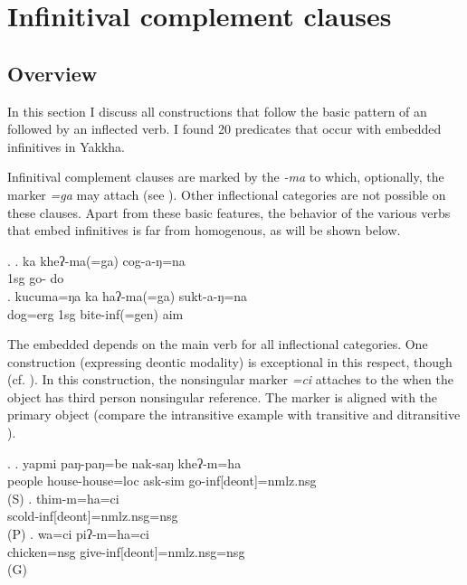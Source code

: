 \section{Infinitival complement clauses}\label{nonfin-comp}
\subsection{Overview}

In this section I discuss all constructions that follow the basic pattern of an  followed by an inflected verb. I found 20 predicates  that occur with embedded infinitives in Yakkha. 

Infinitival complement clauses are marked by the  \emph{-ma} to which, optionally, the  marker \emph{=ga}  may attach (see \Next). Other inflectional categories are not possible on these clauses. Apart from these basic features, the behavior of the various verbs that  embed infinitives is far from homogenous, as will be shown below. 

 \ex. \ag. ka kheʔ-ma(=ga) cog-a-ŋ=na\\
		{\sc 1sg}  go- do\\
		\bg. kucuma=ŋa ka haʔ-ma(=ga) sukt-a-ŋ=na\\
		dog{\sc =erg} {\sc 1sg} bite{\sc -inf(=gen)} aim \\
	
	
The embedded  depends on the main verb for all inflectional categories. One construction (expressing deontic modality) is exceptional in this respect, though (cf. ). In this construction, the nonsingular marker \emph{=ci}  attaches to the  when the object has third person nonsingular reference. The marker is aligned with the primary object (compare the intransitive example \Next[a] with transitive  \Next[b] and ditransitive \Next[c]).  
			
\ex. \ag. yapmi  paŋ-paŋ=be nak-saŋ kheʔ-m=ha\\
		people house-house{\sc =loc} ask-{\sc sim} go-{\sc inf[deont]=nmlz.nsg}\\
	  (S) 
\bg. thim-m=ha=ci\\
scold-{\sc inf[deont]=nmlz.nsg=nsg}\\
 (P)
 \bg. wa=ci piʔ-m=ha=ci\\
chicken{\sc =nsg} give-{\sc inf[deont]=nmlz.nsg=nsg}\\
 (G)



